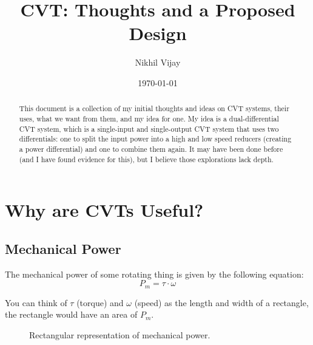 \documentclass[12pt]{article}
\begin{document}
\title{CVT: Thoughts and a Proposed Design}
\author{Nikhil Vijay}
\date{\today}
\maketitle

\begin{abstract}
  This document is a collection of my initial thoughts and ideas on CVT systems, their uses, what we want from them, and my idea for one. My idea is a dual-differential CVT system, which is a single-input and single-output CVT system that uses two differentials: one to split the input power into a high and low speed reducers (creating a power differential) and one to combine them again. It may have been done before (and I have found evidence for this), but I believe those explorations lack depth.
\end{abstract}

\section{Why are CVTs Useful?}
\subsection{Mechanical Power}
The mechanical power of some rotating thing is given by the following equation:
\begin{equation}
  P_{m} = \tau\cdot\omega
\end{equation}

You can think of $\tau$ (torque) and $\omega$ (speed) as the length and width of a rectangle, the rectangle would have an area of $P_{m}$. 

\begin{figure}[H]
  \centering
  \caption{Rectangular representation of mechanical power.}\label{fig:power_rectangle}
\end{figure}
\end{document}
